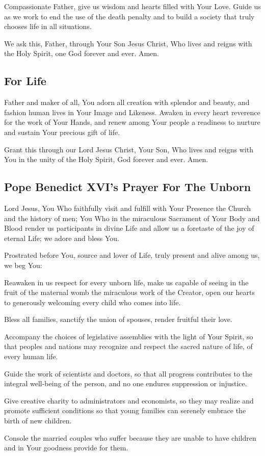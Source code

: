 \documentclass[12pt]{article}
\newcommand{\prayertitle}[1]{\subsection{#1}}
\begin{document}
Compassionate Father, give us wisdom and hearts filled with Your Love.
Guide us as we work to end the use of the death penalty and to build a society that truly chooses life in all situations.

We ask this, Father, through Your Son Jesus Christ, Who lives and reigns with the Holy Spirit, one God forever and ever.
Amen.

\prayertitle{For Life}
Father and maker of all, You adorn all creation with splendor and beauty, and fashion human lives in Your Image and Likeness.
Awaken in every heart reverence for the work of Your Hands, and renew among Your people
a readiness to nurture and sustain Your precious gift of life.

Grant this through our Lord Jesus Christ, Your Son, Who lives and reigns with You in 
the unity of the Holy Spirit, God forever and ever.
Amen.

\prayertitle{Pope Benedict XVI's Prayer For The Unborn}
\label{prayer:benedict_xvi_unborn}
Lord Jesus, 
You Who faithfully visit and fulfill with Your Presence the Church and the history of men;
You Who in the miraculous Sacrament of Your Body and Blood render us participants in divine Life and allow us a foretaste of the joy of eternal Life;
we adore and bless You.

Prostrated before You, source and lover of Life, truly present and alive among us, we beg You:

Reawaken in us respect for every unborn life, make us capable of seeing in the fruit of the maternal womb the miraculous work of the Creator, open our hearts to generously welcoming every child who comes into life.

Bless all families, sanctify the union of spouses, render fruitful their love.

Accompany the choices of legislative assemblies with the light of Your Spirit, so that peoples and nations may recognize and respect the sacred nature of life, of every human life.

Guide the work of scientists and doctors, so that all progress contributes to the integral well-being of the person, and no one endures suppression or injustice.

Give creative charity to administrators and economists, so they may realize and promote sufficient conditions so that young families can serenely embrace the birth of new children.

Console the married couples who suffer because they are unable to have children and in Your goodness provide for them.
\end{document}
